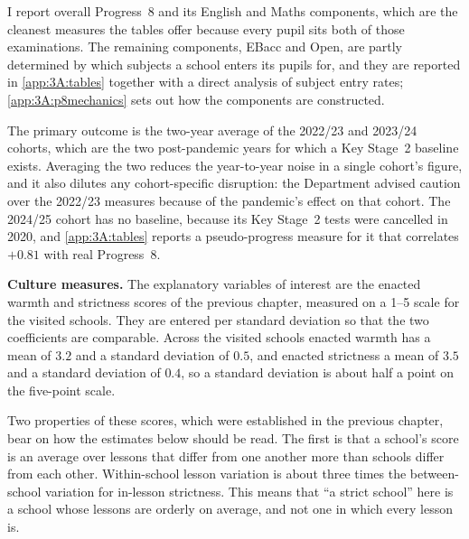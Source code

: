 I report overall Progress~8 and its English and Maths components, which are
the cleanest measures the tables offer because every pupil sits both of
those examinations. The remaining components, EBacc and Open, are partly
determined by which subjects a school enters its pupils for, and they are
reported in \cref{app:3A:tables} together with a direct analysis of subject
entry rates; \cref{app:3A:p8mechanics} sets out how the components are
constructed.

The primary outcome is the two-year average of the 2022/23 and
2023/24 cohorts, which are the two post-pandemic years for which a Key
Stage~2 baseline exists. Averaging the two reduces the year-to-year noise
in a single cohort's figure, and it also dilutes any cohort-specific
disruption: the Department advised caution over the 2022/23 measures
because of the pandemic's effect on that cohort. The 2024/25 cohort has no baseline, because its
Key Stage~2 tests were cancelled in 2020, and \cref{app:3A:tables} reports a
pseudo-progress measure for it that correlates $+0.81$ with real
Progress~8.

\textbf{Culture measures.} The explanatory variables of interest are the enacted warmth and strictness scores of the previous chapter, measured on a 1--5 scale for the \NTierOne{} visited schools. They are
entered per standard deviation so that the two coefficients are comparable.
Across the visited schools enacted warmth has a mean of $3.2$ and a standard deviation of $0.5$, and enacted strictness a mean of $3.5$ and a standard deviation of $0.4$, so a standard deviation is about half a point on the five-point scale.

Two properties of these scores, which were established in
the previous chapter, bear on how the estimates below should be read. The
first is that a school's score is an average over lessons that differ from
one another more than schools differ from each other. Within-school lesson
variation is about three times the between-school variation for in-lesson
strictness. This means that ``a strict school'' here is a school whose
lessons are orderly on average, and not one in which every lesson is.

